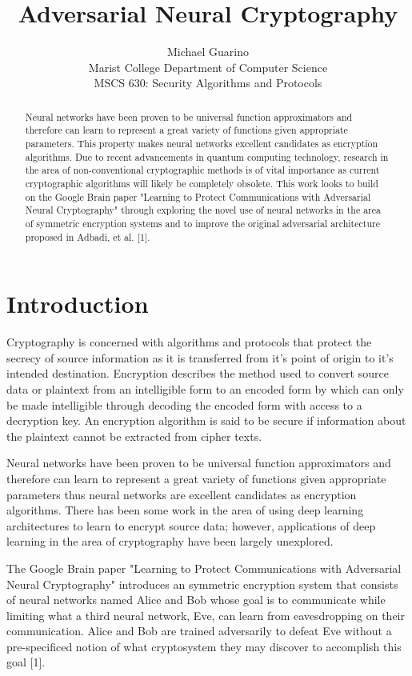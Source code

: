 \documentclass[12pt]{article}
\begin{document}
\title{Adversarial Neural Cryptography}
\author{Michael Guarino\\
        Marist College Department of Computer Science\\
        MSCS 630: Security Algorithms and Protocols}
\maketitle
\begin{abstract}
Neural networks have been proven to be universal function approximators and therefore can learn to represent a great variety of functions given appropriate parameters. This property makes neural networks excellent candidates as encryption algorithms. Due to recent advancements in quantum computing technology, research in the area of non-conventional cryptographic methods is of vital importance as current cryptographic algorithms will likely be completely obsolete. This work looks to build on the Google Brain paper "Learning to Protect Communications with Adversarial Neural Cryptography" through exploring the novel use of neural networks in the area of symmetric encryption systems and to improve the original adversarial architecture proposed in Adbadi, et al. [1].
\end{abstract}

\section{Introduction}
Cryptography is concerned with algorithms and protocols that protect the secrecy of source information as it is transferred from it's point of origin to it's intended destination. Encryption describes the method used to convert source data or plaintext from an intelligible form to an encoded form by which can only be made intelligible through decoding the encoded form with access to a decryption key. An encryption algorithm is said to be secure if information about the plaintext cannot be extracted from cipher texts.

Neural networks have been proven to be universal function approximators and therefore can learn to represent a great variety of functions given appropriate parameters thus neural networks are excellent candidates as encryption algorithms. There has been some work in the area of using deep learning architectures to learn to encrypt source data; however, applications of deep learning in the area of cryptography have been largely unexplored.

The Google Brain paper "Learning to Protect Communications with Adversarial Neural Cryptography" introduces an symmetric encryption system that consists of neural networks named Alice and Bob whose goal is to communicate while limiting what a third neural network, Eve, can learn from eavesdropping on their communication. Alice and Bob are trained adversarily to defeat Eve without a pre-specificed notion of what cryptosystem they may discover to accomplish this goal [1].
\end{document}
